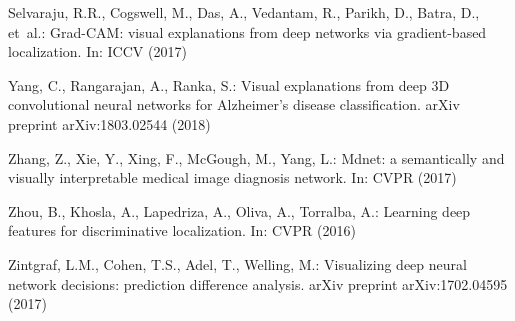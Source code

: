 \documentclass[runningheads]{llncs}
\begin{document}
\begin{thebibliography}{10}
	Selvaraju, R.R., Cogswell, M., Das, A., Vedantam, R., Parikh, D., Batra, D.,
	et~al.: {Grad-CAM}: visual explanations from deep networks via gradient-based
	localization. In: ICCV (2017)
	
	Yang, C., Rangarajan, A., Ranka, S.: Visual explanations from deep {3D}
	convolutional neural networks for {A}lzheimer's disease classification. arXiv
	preprint arXiv:1803.02544  (2018)
	
	Zhang, Z., Xie, Y., Xing, F., McGough, M., Yang, L.: Mdnet: a semantically and
	visually interpretable medical image diagnosis network. In: CVPR (2017)
	
	Zhou, B., Khosla, A., Lapedriza, A., Oliva, A., Torralba, A.: Learning deep
	features for discriminative localization. In: CVPR (2016)
	
	Zintgraf, L.M., Cohen, T.S., Adel, T., Welling, M.: Visualizing deep neural
	network decisions: prediction difference analysis. arXiv preprint
	arXiv:1702.04595  (2017)
	
\end{thebibliography}
\end{document}
